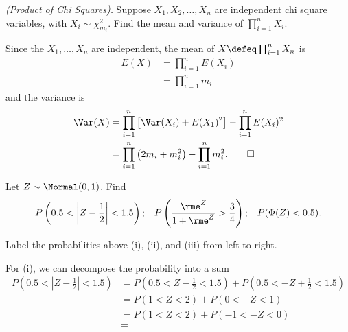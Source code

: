 \begin{problem}[Handout 13, \# 19]
  \emph{(Product of Chi Squares).} Suppose \(X_1,X_2,\dotsc,X_n\) are
  independent chi square variables, with \(X_i\sim\chi_{m_i}^2\). Find the
  mean and variance of \(\prod_{i=1}^n X_i\).
\end{problem}
\begin{solution}
  Since the \(X_1,\dotsc,X_n\) are independent, the mean of
  \(X\defeq\prod_{i=1}^n X_n\) is
  \begin{align*}
    E(X)
    &=\prod_{i=1}^n E(X_i)\\
    &=\prod_{i=1}^n m_i
  \end{align*}
  and the variance is
  \begin{align*}
    \Var(X)
    &=\prod_{i=1}^n\left[\Var(X_i)+E(X_1)^2\right]-\prod_{i=1}^nE(X_i)^2\\
    &=\prod_{i=1}^n\left(2m_i+m_i^2\right)-\prod_{i=1}^n m_i^2.\qedhere
  \end{align*}
\end{solution}
\newpage

\begin{problem}[Handout 13, \# 20]
  Let \(Z\sim\Normal(0,1)\). Find
  \[
    \begin{aligned}
      P\left(0.5<\left|Z-\frac{1}{2}\right|<1.5\right);
      && P\left(\frac{\rme^Z}{1+\rme^Z}>\frac{3}{4}\right);
      &&P(\Phi(Z)<0.5).
    \end{aligned}
  \]
\end{problem}
\begin{solution}
  Label the probabilities above (i), (ii), and (iii) from left to
  right.

  For (i), we can decompose the probability into a sum
  \begin{align*}
    P\left(0.5<\left|Z-\frac{1}{2}\right|<1.5\right)%
    &=P\left(0.5<Z-\frac{1}{2}<1.5\right)+%
      P\left(0.5<-Z+\frac{1}{2}<1.5\right)\\
    &=P\left(1<Z<2\right)+%
    P\left(0<-Z<1\right)\\
    &=P\left(1<Z<2\right)+%
      P\left(-1<-Z<0\right)\\
    &=
  \end{align*}
\end{solution}
\newpage

